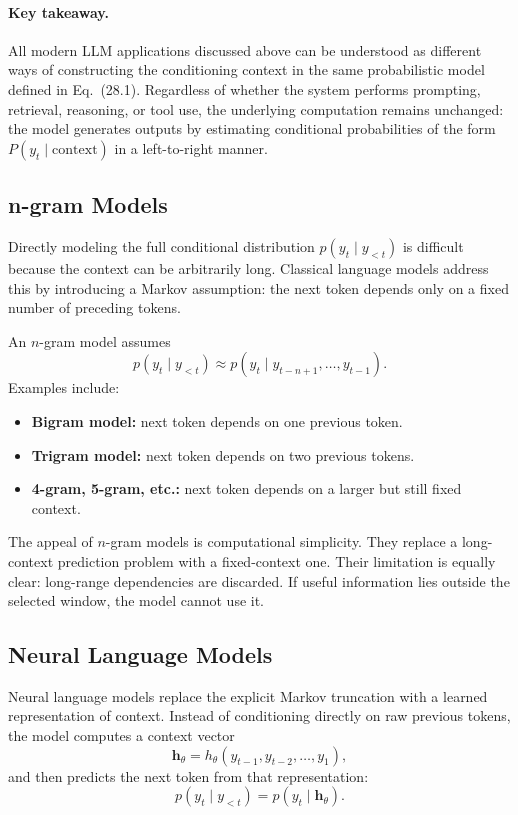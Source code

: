\documentclass{article}
\begin{document}
\paragraph{Key takeaway.}
All modern LLM applications discussed above can be understood as different ways of constructing the conditioning context in the same probabilistic model defined in Eq.~(28.1). Regardless of whether the system performs prompting, retrieval, reasoning, or tool use, the underlying computation remains unchanged: the model generates outputs by estimating conditional probabilities of the form $P(y_t \mid \text{context})$ in a left-to-right manner.

\subsection{n-gram Models}
Directly modeling the full conditional distribution $p(y_t\mid y_{<t})$ is difficult because the context can be arbitrarily long. Classical language models address this by introducing a Markov assumption: the next token depends only on a fixed number of preceding tokens.

An $n$-gram model assumes
\[
p(y_t\mid y_{<t}) \approx p(y_t\mid y_{t-n+1},\dots,y_{t-1}).
\]
Examples include:
\begin{itemize}
    \item \textbf{Bigram model:} next token depends on one previous token.
    \item \textbf{Trigram model:} next token depends on two previous tokens.
    \item \textbf{4-gram, 5-gram, etc.:} next token depends on a larger but still fixed context.
\end{itemize}

The appeal of $n$-gram models is computational simplicity. They replace a long-context prediction problem with a fixed-context one. Their limitation is equally clear: long-range dependencies are discarded. If useful information lies outside the selected window, the model cannot use it.

\subsection{Neural Language Models}
Neural language models replace the explicit Markov truncation with a learned representation of context. Instead of conditioning directly on raw previous tokens, the model computes a context vector
\[
\bm{h}_\theta = h_\theta(y_{t-1},y_{t-2},\dots,y_1),
\]
and then predicts the next token from that representation:
\[
p(y_t\mid y_{<t}) = p(y_t\mid \bm{h}_\theta).
\]
\end{document}

